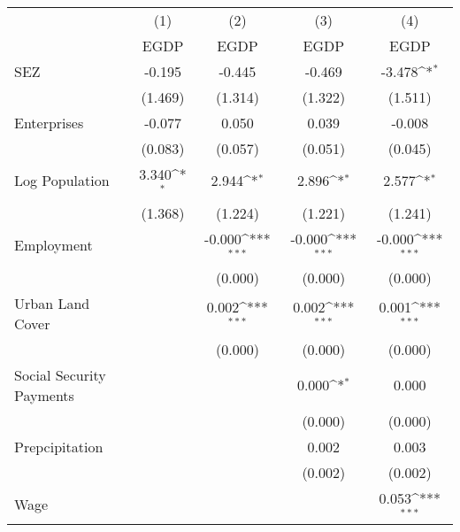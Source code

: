 {
\def\sym#1{\ifmmode^{#1}\else\(^{#1}\)\fi}
\begin{tabular}{l*{4}{c}}
\hline\hline
                    &\multicolumn{1}{c}{(1)}&\multicolumn{1}{c}{(2)}&\multicolumn{1}{c}{(3)}&\multicolumn{1}{c}{(4)}\\
                    &\multicolumn{1}{c}{EGDP}&\multicolumn{1}{c}{EGDP}&\multicolumn{1}{c}{EGDP}&\multicolumn{1}{c}{EGDP}\\
\hline
SEZ                 &      -0.195         &      -0.445         &      -0.469         &      -3.478\sym{*}  \\
                    &     (1.469)         &     (1.314)         &     (1.322)         &     (1.511)         \\
Enterprises         &      -0.077         &       0.050         &       0.039         &      -0.008         \\
                    &     (0.083)         &     (0.057)         &     (0.051)         &     (0.045)         \\
Log Population      &       3.340\sym{*}  &       2.944\sym{*}  &       2.896\sym{*}  &       2.577\sym{*}  \\
                    &     (1.368)         &     (1.224)         &     (1.221)         &     (1.241)         \\
Employment          &                     &      -0.000\sym{***}&      -0.000\sym{***}&      -0.000\sym{***}\\
                    &                     &     (0.000)         &     (0.000)         &     (0.000)         \\
Urban Land Cover    &                     &       0.002\sym{***}&       0.002\sym{***}&       0.001\sym{***}\\
                    &                     &     (0.000)         &     (0.000)         &     (0.000)         \\
Social Security Payments&                     &                     &       0.000\sym{*}  &       0.000         \\
                    &                     &                     &     (0.000)         &     (0.000)         \\
Prepcipitation      &                     &                     &       0.002         &       0.003         \\
                    &                     &                     &     (0.002)         &     (0.002)         \\
Wage                &                     &                     &                     &       0.053\sym{***}\\

\end{tabular}}
